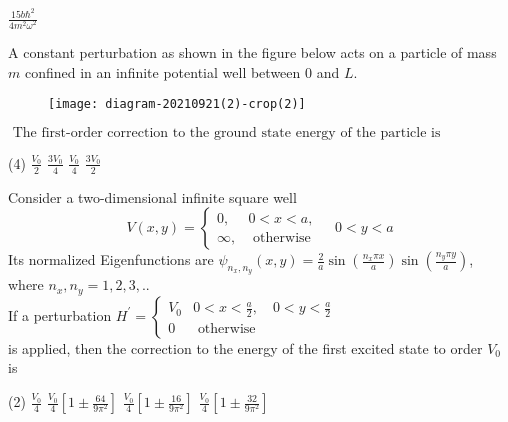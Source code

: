 \begin{enumerate}
\begin{tasks}
	\task[\textbf{D.}]$\frac{15 b \hbar^{2}}{4 m^{2} \omega^{2}}$
\end{tasks}
\begin{minipage}{\textwidth}
	\item A constant perturbation as shown in the figure below acts on a particle of mass $m$ confined in an infinite potential well between 0 and $L$.\\
	\begin{figure}[H]
		\centering
		\texttt{[image: diagram-20210921(2)-crop(2)]}
	\end{figure}
	$\text { The first-order correction to the ground state energy of the particle is }$
\end{minipage}
\begin{tasks}(4)
	\task[\textbf{A.}] $\frac{V_{0}}{2}$
	\task[\textbf{B.}]$\frac{3 V_{0}}{4}$
	\task[\textbf{C.}]$\frac{V_{0}}{4}$
	\task[\textbf{D.}] $\frac{3 V_{0}}{2}$
\end{tasks}
\begin{minipage}{\textwidth}
	\item Consider a two-dimensional infinite square well
	$$
	V(x, y)=\left\{\begin{array}{ll}
	0, & 0<x<a, \\
	\infty, & \text { otherwise }
	\end{array} \quad 0<y<a\right.
	$$
	Its normalized Eigenfunctions are $\psi_{n_{x}, n_{y}}(x, y)=\frac{2}{a} \sin \left(\frac{n_{x} \pi x}{a}\right) \sin \left(\frac{n_{y} \pi y}{a}\right)$,
	where $n_{x}, n_{y}=1,2,3, . .$\\
	If a perturbation $H^{\prime}=\left\{\begin{array}{cc}V_{0} & 0<x<\frac{a}{2}, \quad 0<y<\frac{a}{2} \\ 0 & \text { otherwise }\end{array}\right.$ \\is applied, then the correction to the
	energy of the first excited state to order $V_{0}$ is
\end{minipage}
\begin{tasks}(2)
	\task[\textbf{A.}] $\frac{V_{0}}{4}$
	\task[\textbf{B.}]$\frac{V_{0}}{4}\left[1 \pm \frac{64}{9 \pi^{2}}\right]$
	\task[\textbf{C.}]$\frac{V_{0}}{4}\left[1 \pm \frac{16}{9 \pi^{2}}\right]$
	\task[\textbf{D.}]$\frac{V_{0}}{4}\left[1 \pm \frac{32}{9 \pi^{2}}\right]$
\end{tasks}
\begin{minipage}{\textwidth}

\end{minipage}
\end{enumerate}
